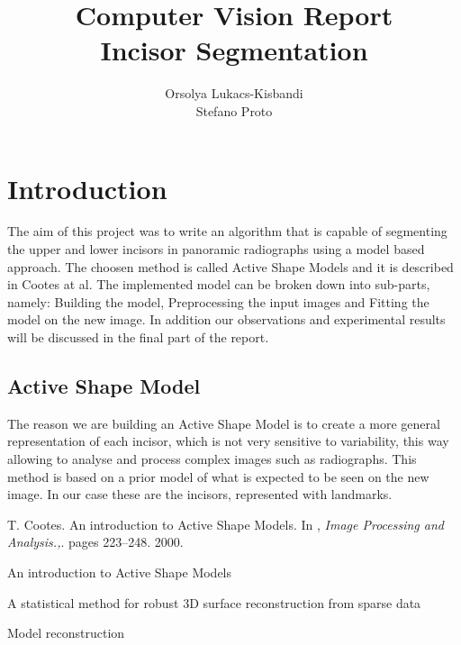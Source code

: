 \documentclass{article}
\begin{document}
\author{Orsolya Lukacs-Kisbandi \\ Stefano Proto}
\title{%
  \textbf{Computer Vision Report } \\
   Incisor Segmentation }

\maketitle

\section{Introduction}

The aim of this project was to write  an  algorithm  that  is  capable  of  segmenting  the upper and lower incisors in panoramic radiographs  using  a  model  based  approach. The choosen method is called Active Shape Models and it is described in \cite{cootes} Cootes at al. The implemented model can be broken down into sub-parts, namely: Building the model, Preprocessing the input images and Fitting the model on the new image. In addition our observations and experimental results will be discussed in the final part of the report. 

\subsection{Active Shape Model}

The reason we are building an Active Shape Model is to create a more general representation of each incisor, which is not very sensitive to variability, this way allowing to analyse and process complex images such as radiographs. This method is based on a prior model of what is expected to be seen on the new image. In our case these are the incisors, represented with landmarks.


\begin{thebibliography}{1}
T. Cootes. An introduction to Active Shape Models. In , 
\textit{Image Processing and Analysis.,}. 
pages 223–248. 2000.
 
An introduction to Active Shape Models

A statistical method for robust 3D surface reconstruction from sparse data

Model reconstruction 
% 

\end{thebibliography}
\end{document}
